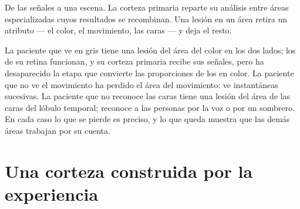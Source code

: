 \begin{omfigure}

{\small De las señales a una escena. La corteza primaria reparte su
análisis entre áreas especializadas cuyos resultados se recombinan. Una
lesión en un área retira un atributo --- el color, el movimiento, las
caras --- y deja el resto.}
\end{omfigure}

\begin{example}\label{ex:g11:vision-and-brain:patients}
La paciente que ve en gris tiene una lesión del área del color en los
dos lados; los  de su retina funcionan, y su corteza primaria
recibe sus señales, pero ha desaparecido la etapa que convierte las
proporciones de los  en color. La paciente que no ve el movimiento
ha perdido el área del movimiento: ve instantáneas sucesivas. La
paciente que no reconoce las caras tiene una lesión del área de las
caras del lóbulo temporal; reconoce a las personas por la voz o por un
sombrero. En cada caso lo que se pierde es preciso, y lo que queda
muestra que las demás áreas trabajan por su cuenta.
\end{example}

\section{Una corteza construida por la experiencia}

